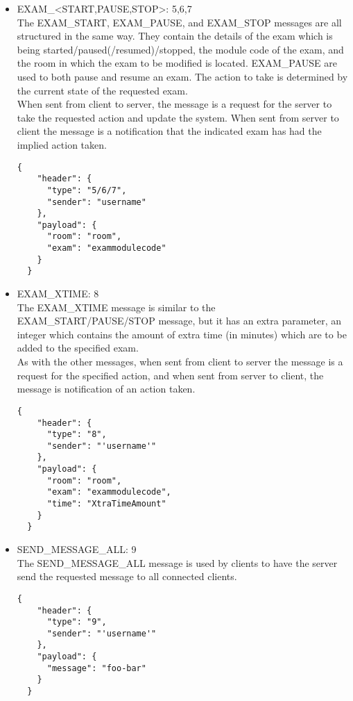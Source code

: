 \begin{itemize}
\item EXAM\_\textless START,PAUSE,STOP\textgreater: 5,6,7\\
  The EXAM\_START, EXAM\_PAUSE, and EXAM\_STOP messages are all structured in the same way. They contain the details of the exam which is being started/paused(/resumed)/stopped, the module code of the exam, and the room in which the exam to be modified is located.  EXAM\_PAUSE are used to both pause and resume an exam.  The action to take is determined by the current state of the requested exam.\\
  When sent from client to server, the message is a request for the server to take the requested action and update the system.  When sent from server to client the message is a notification that the indicated exam has had the implied action taken.
  \lstset{language=JSON}
  \begin{lstlisting}[tabsize=2,breaklines=true]
  {
    "header": {
      "type": "5/6/7",
      "sender": "username"
    },
    "payload": {
      "room": "room",
      "exam": "exammodulecode"
    }
  }
  \end{lstlisting}

\item EXAM\_XTIME: 8\\
  The EXAM\_XTIME message is similar to the EXAM\_START/PAUSE/STOP message, but it has an extra parameter, an integer which contains the amount of extra time (in minutes) which are to be added to the specified exam.\\
  As with the other messages, when sent from client to server the message is a request for the specified action, and when sent from server to client, the message is notification of an action taken.
  \lstset{language=JSON}
  \begin{lstlisting}[tabsize=2,breaklines=true]
  {
    "header": {
      "type": "8",
      "sender": "'username'"
    },
    "payload": {
      "room": "room",
      "exam": "exammodulecode",
      "time": "XtraTimeAmount"
    }
  }
  \end{lstlisting}

\item SEND\_MESSAGE\_ALL: 9\\
  The SEND\_MESSAGE\_ALL message is used by clients to have the server send the requested message to all connected clients.
  \lstset{language=JSON}
  \begin{lstlisting}[tabsize=2,breaklines=true]
  {
    "header": {
      "type": "9",
      "sender": "'username'"
    },
    "payload": {
      "message": "foo-bar"
    }
  }
  \end{lstlisting}


\end{itemize}

